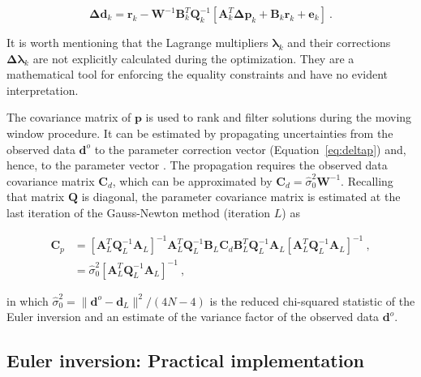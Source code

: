 \begin{equation}
  \mathbf{\Delta d}_k =
  \mathbf{r}_k -
  \mathbf{W}^{-1}\mathbf{B}_k^T\mathbf{Q}_k^{-1}
  \left[\mathbf{A}_k^T\mathbf{\Delta p}_k + \mathbf{B}_k\mathbf{r}_k + \mathbf{e}_k\right]
  \ .
  \label{eq:deltad}
\end{equation}

\noindent
It is worth mentioning that the Lagrange multipliers
$\boldsymbol{\lambda}_k$ and their corrections
$\boldsymbol{\Delta\lambda}_k$ are not explicitly calculated during the
optimization.
They are a mathematical tool for enforcing the equality constraints and have no
evident interpretation.

The covariance matrix of $\mathbf{p}$ is used to rank and filter solutions
during the moving window procedure.
It can be estimated by propagating uncertainties from the observed data
$\mathbf{d}^o$ to the
parameter correction vector (Equation~\ref{eq:deltap}) and, hence, to the
parameter vector \citep{WellsKrakiwsky1971}.
The propagation requires the observed data covariance matrix $\mathbf{C}_d$,
which can be approximated by
$\mathbf{C}_d = \hat{\sigma}_0^2\mathbf{W}^{-1}$.
Recalling that matrix $\mathbf{Q}$ is diagonal,
the parameter covariance matrix is estimated at the last iteration of the
Gauss-Newton method (iteration $L$) as

\begin{equation}
  \begin{aligned}
    \mathbf{C}_{p} &=
      \left[\mathbf{A}_L^T\mathbf{Q}_L^{-1}\mathbf{A}_L\right]^{-1}
      \mathbf{A}_L^T\mathbf{Q}_L^{-1}\mathbf{B}_L
      \mathbf{C}_d
      \mathbf{B}_L^T\mathbf{Q}_L^{-1}\mathbf{A}_L
      \left[\mathbf{A}_L^T\mathbf{Q}_L^{-1}\mathbf{A}_L\right]^{-1}
    \ ,
    \\
    &= \hat{\sigma}_0^2 \left[\mathbf{A}_L^T\mathbf{Q}_L^{-1}\mathbf{A}_L\right]^{-1}
    \ ,
  \end{aligned}
  \label{eq:cov}
\end{equation}

\noindent
in which
$\hat{\sigma}^2_0 = \|\mathbf{d}^o - \mathbf{d}_L\|^2 / (4N - 4)$ is the
reduced chi-squared statistic of the Euler inversion and an estimate of the
variance factor of the observed data $\mathbf{d}^o$.



\subsection{Euler inversion: Practical implementation}

